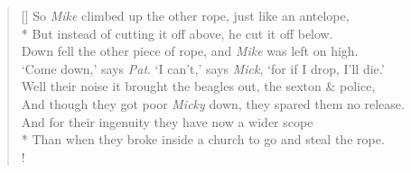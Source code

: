 \documentclass[MAIN]{subfiles}
\begin{document}
\begin{verse}[\versewidth]
So \emph{Mike} climbed up the other rope, just like an antelope,\\*
But instead of cutting it off above, he cut it off below.\\
Down fell the other piece of rope, and \emph{Mike} was left on high.\\
`Come down,' says \emph{Pat}. `I can't,' says \emph{Mick}, `for if I drop, I'll die.'\\
Well their noise it brought the beagles out, the sexton \& police,\\
And though they got poor \emph{Micky} down, they spared them no release.\\
And for their ingenuity they have now a wider scope\\*
Than when they broke inside a church to go and steal the rope.\\!
\end{verse}
\end{document}

